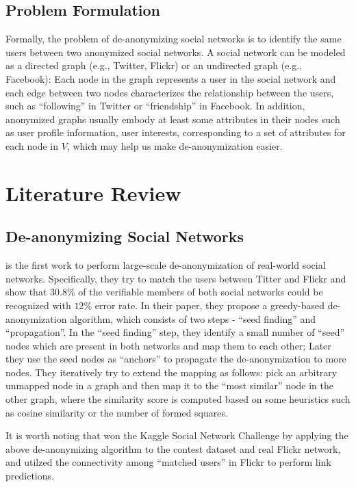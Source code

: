 \documentclass[11pt,letterpaper]{article}
\begin{document}
\subsection{Problem Formulation}
Formally, the problem of de-anonymizing social networks is to identify the same users between two anonymized social networks.  A social network can be modeled as a directed graph (e.g., Twitter, Flickr) or an undirected graph (e.g., Facebook): Each node in the graph represents a user in the social network and each edge between two nodes characterizes the relationship between the users, such as ``following'' in Twitter or ``friendship'' in Facebook. In addition, anonymized graphs usually embody at least some attributes in their nodes such as user profile information, user interests, corresponding to a set of attributes for each node in $V$, which may help us make de-anonymization easier.

\section{Literature Review}

\subsection{De-anonymizing Social Networks}

\cite{Narayanan2009} is the first work to perform large-scale de-anonymization of real-world social networks. Specifically, they try to match the users between Titter and Flickr and show that $30.8\%$ of the verifiable members of both social networks could be recognized with $12\%$ error rate. In their paper, they propose a greedy-based de-anonymization algorithm, which consists of two steps - ``seed finding'' and ``propagation''. In the ``seed finding'' step, they identify a small number of ``seed'' nodes which are present in both networks and map them to each other; Later they use the seed nodes as ``anchors'' to propagate the de-anonymization to more nodes. They iteratively try to extend the mapping as follows: pick an arbitrary unmapped node in a graph and then map it to the ``most similar'' node in the other graph, where the similarity score is computed based on some heuristics such as cosine similarity or the number of formed squares.

It is worth noting that \cite{Narayanan2011} won the Kaggle Social Network Challenge by applying the above de-anonymizing algorithm to the contest dataset and real Flickr network, and utilzed the connectivity among ``matched users'' in Flickr to perform link predictions. 
\end{document}
